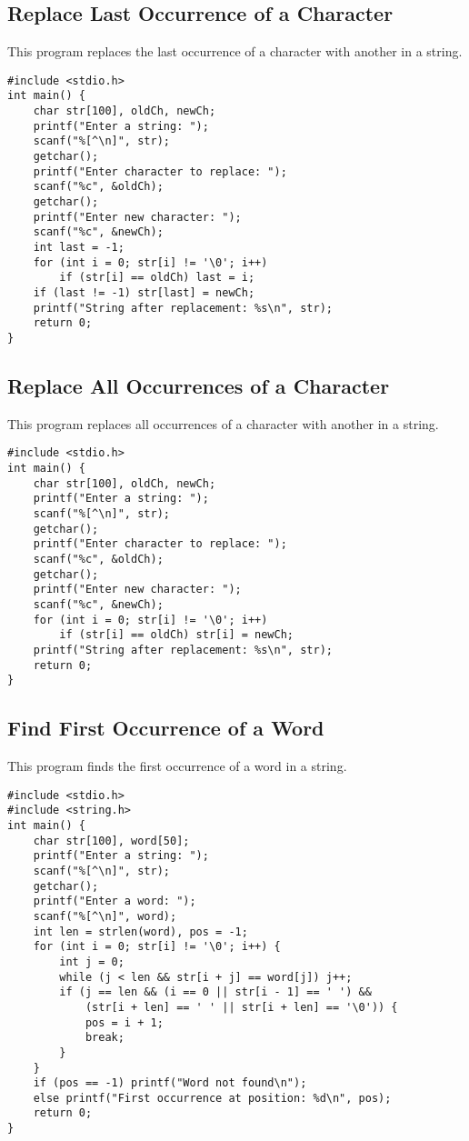 \documentclass[a4paper,12pt]{article}
\begin{document}
\subsection{Replace Last Occurrence of a Character}
This program replaces the last occurrence of a character with another in a string.
\begin{lstlisting}[caption={Replace Last Occurrence of a Character}]
#include <stdio.h>
int main() {
    char str[100], oldCh, newCh;
    printf("Enter a string: ");
    scanf("%[^\n]", str);
    getchar();
    printf("Enter character to replace: ");
    scanf("%c", &oldCh);
    getchar();
    printf("Enter new character: ");
    scanf("%c", &newCh);
    int last = -1;
    for (int i = 0; str[i] != '\0'; i++)
        if (str[i] == oldCh) last = i;
    if (last != -1) str[last] = newCh;
    printf("String after replacement: %s\n", str);
    return 0;
}
\end{lstlisting}
\clearpage

\subsection{Replace All Occurrences of a Character}
This program replaces all occurrences of a character with another in a string.
\begin{lstlisting}[caption={Replace All Occurrences of a Character}]
#include <stdio.h>
int main() {
    char str[100], oldCh, newCh;
    printf("Enter a string: ");
    scanf("%[^\n]", str);
    getchar();
    printf("Enter character to replace: ");
    scanf("%c", &oldCh);
    getchar();
    printf("Enter new character: ");
    scanf("%c", &newCh);
    for (int i = 0; str[i] != '\0'; i++)
        if (str[i] == oldCh) str[i] = newCh;
    printf("String after replacement: %s\n", str);
    return 0;
}
\end{lstlisting}
\clearpage

\subsection{Find First Occurrence of a Word}
This program finds the first occurrence of a word in a string.
\begin{lstlisting}[caption={Find First Occurrence of a Word}]
#include <stdio.h>
#include <string.h>
int main() {
    char str[100], word[50];
    printf("Enter a string: ");
    scanf("%[^\n]", str);
    getchar();
    printf("Enter a word: ");
    scanf("%[^\n]", word);
    int len = strlen(word), pos = -1;
    for (int i = 0; str[i] != '\0'; i++) {
        int j = 0;
        while (j < len && str[i + j] == word[j]) j++;
        if (j == len && (i == 0 || str[i - 1] == ' ') && 
            (str[i + len] == ' ' || str[i + len] == '\0')) {
            pos = i + 1;
            break;
        }
    }
    if (pos == -1) printf("Word not found\n");
    else printf("First occurrence at position: %d\n", pos);
    return 0;
}
\end{lstlisting}
\clearpage
\end{document}
